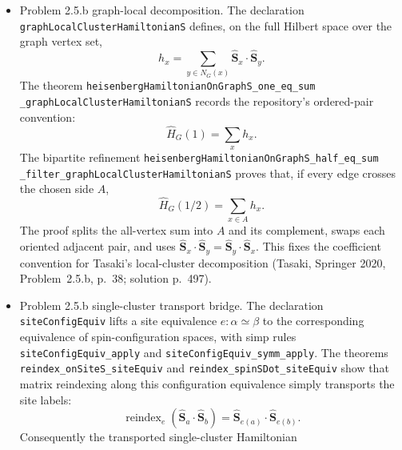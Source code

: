 \documentclass[a4paper,11pt]{article}
\begin{document}
\begin{itemize}
        The two \texttt{tasaki25b\_local\_cluster} wrappers specialize this
        abstract sum bound to local cluster Hamiltonians whose
        minimum eigenvalues are the Problem~2.5.a values.  In closed form this
        is Tasaki's lower bound
        \[
          E_{\rm GS}
          \ge
          -\sum_{x\in A} S\bigl(1+|N(x)|S\bigr),
          \qquad S=N/2,
        \]
        once the global bipartite Hamiltonian is decomposed as
        \(\hat H=\sum_{x\in A}\hat h_x\) (Tasaki, Springer 2020,
        Problem~2.5.b, p.~38; solution p.~497; Lemma~A.5, p.~468).
  \item Problem 2.5.b graph-local decomposition.  The declaration
        \texttt{graphLocalClusterHamiltonianS} defines, on the full
        Hilbert space over the graph vertex set,
        \[
          h_x=\sum_{y\in N_G(x)}
            \hat{\mathbf S}_x\cdot\hat{\mathbf S}_y .
        \]
        The theorem
        \texttt{heisenbergHamiltonianOnGraphS\_one\_eq\_sum}
        \texttt{\_graphLocalClusterHamiltonianS} records the repository's
        ordered-pair convention:
        \[
          \hat H_G(1)=\sum_x h_x .
        \]
        The bipartite refinement
        \texttt{heisenbergHamiltonianOnGraphS\_half\_eq\_sum}
        \texttt{\_filter\_graphLocalClusterHamiltonianS} proves that, if every
        edge crosses the chosen side \(A\),
        \[
          \hat H_G(1/2)=\sum_{x\in A}h_x .
        \]
        The proof splits the all-vertex sum into \(A\) and its complement,
        swaps each oriented adjacent pair, and uses
        \(\hat{\mathbf S}_x\cdot\hat{\mathbf S}_y
        =\hat{\mathbf S}_y\cdot\hat{\mathbf S}_x\).  This fixes the coefficient
        convention for Tasaki's local-cluster decomposition (Tasaki, Springer
        2020, Problem~2.5.b, p.~38; solution p.~497).
  \item Problem 2.5.b single-cluster transport bridge.  The declaration
        \texttt{siteConfigEquiv} lifts a site equivalence \(e:\alpha\simeq\beta\)
        to the corresponding equivalence of spin-configuration spaces, with
        simp rules \texttt{siteConfigEquiv\_apply} and
        \texttt{siteConfigEquiv\_symm\_apply}.  The theorems
        \texttt{reindex\_onSiteS\_siteEquiv} and
        \texttt{reindex\_spinSDot\_siteEquiv} show that matrix reindexing along
        this configuration equivalence simply transports the site labels:
        \[
          \operatorname{reindex}_e
          (\hat{\mathbf S}_a\cdot\hat{\mathbf S}_b)
          =
          \hat{\mathbf S}_{e(a)}\cdot\hat{\mathbf S}_{e(b)} .
        \]
        Consequently the transported single-cluster Hamiltonian

\end{itemize}
\end{document}
